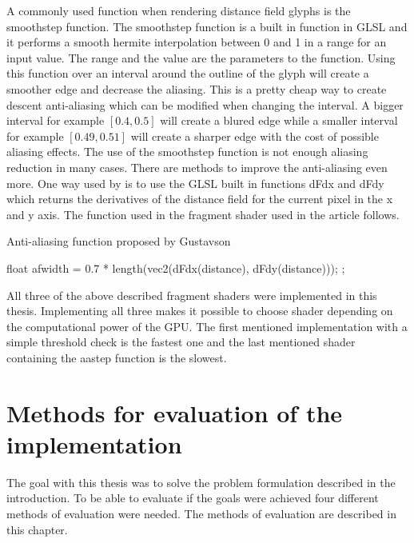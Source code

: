 A commonly used function when rendering distance field glyphs is the smoothstep function. The smoothstep function is a built in function in GLSL and it performs a smooth hermite interpolation between 0 and 1 in a range for an input value. The range and the value are the parameters to the function. Using this function over an interval around the outline of the glyph will create a smoother edge and decrease the aliasing. This is a pretty cheap way to create descent anti-aliasing which can be modified when changing the interval. A bigger interval for example $[0.4,0.5]$ will create a blured edge while a smaller interval for example $[0.49,0.51]$ will create a sharper edge with the cost of possible aliasing effects. The use of the smoothstep function is not enough aliasing reduction in many cases. There are methods to improve the anti-aliasing even more. One way used by \citet{gustavson20122d} is to use the GLSL built in functions dFdx and dFdy which returns the derivatives of the distance field for the current pixel in the x and y axis. The function used in the fragment shader used in the article follows.
\begin{algorithm}[H]
\caption{Anti-aliasing function proposed by Gustavson}
\begin{algorithmic}
\State float afwidth = 0.7 * length(vec2(dFdx(distance), dFdy(distance)));
\State \Return {};
\EndProcedure
\end{algorithmic}
\end{algorithm}
All three of the above described fragment shaders were implemented in this thesis. Implementing all three makes it possible to choose shader depending on the computational power of the GPU. The first mentioned implementation with a simple threshold check is the fastest one and the last mentioned shader containing the aastep function is the slowest.
\chapter{Methods for evaluation of the implementation}
The goal with this thesis was to solve the problem formulation described in the introduction. To be able to evaluate if the goals were achieved four different methods of evaluation were needed. The methods of evaluation are described in this chapter.
